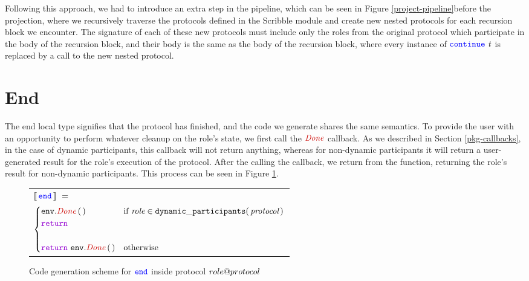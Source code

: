 \documentclass[12pt,twoside]{report}
\begin{document}
Following this approach, we had to introduce an extra step in the pipeline, which can be seen in Figure \ref{project-pipeline}before the projection, where we recursively traverse the protocols defined in the Scribble module and create new nested protocols for each recursion block we encounter. The signature of each of these new protocols must include only the roles from the original protocol which participate in the body of the recursion block, and their body is the same as the body of the recursion block, where every instance of ${\color{blue}\mathtt{continue}}\ \mathit{t}$ is replaced by a call to the new nested protocol.


\section{End}
The end local type signifies that the protocol has finished, and the code we generate shares the same semantics. To provide the user with an opportunity to perform whatever cleanup on the role's state, we first call the $\functionname{Done}$ callback. As we described in Section \ref{pkg-callbacks}, in the case of dynamic participants, this callback will not return anything, whereas for non-dynamic participants it will return a user-generated result for the role's execution of the protocol. After the calling the callback, we return from the function, returning the role's result for non-dynamic participants. This process can be seen in Figure \ref{end-codegen}.

\begin{figure}[!h]
    \begin{center}
        \begin{tabular}{l}
            $\llbracket\,{\color{blue}\mathtt{end}}\,\rrbracket\ =\ $\\[3pt]
            \quad 
            \begin{math}
                \begin{cases}
                    \methodcall{\envparam}{Done}\,\emptyparams  & \text{if}\ \textit{role} \in \mathtt{dynamic\_participants}(\,\textit{protocol}\,)\\
                    \goreturn  & \\\\
                    \goreturn\ \methodcall{\envparam}{Done}\,\emptyparams & \text{otherwise}
                \end{cases}
            \end{math}
            
            
        \end{tabular}
    \end{center}
    \caption{Code generation scheme for ${\color{blue}\mathtt{end}}$ inside protocol ${role@protocol}$}
    \label{end-codegen}
\end{figure}
\end{document}
